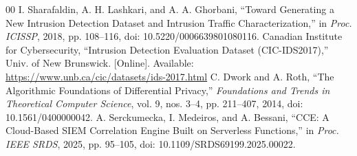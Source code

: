 \documentclass[conference,letterpaper]{IEEEtran}
\begin{document}
\begin{thebibliography}{00}
 I. Sharafaldin, A. H. Lashkari, and A. A. Ghorbani, ``Toward Generating a New Intrusion Detection Dataset and Intrusion Traffic Characterization,'' in \emph{Proc. ICISSP}, 2018, pp. 108--116, doi: 10.5220/0006639801080116.
 Canadian Institute for Cybersecurity, ``Intrusion Detection Evaluation Dataset (CIC-IDS2017),'' Univ. of New Brunswick. [Online]. Available: \url{https://www.unb.ca/cic/datasets/ids-2017.html}
 C. Dwork and A. Roth, ``The Algorithmic Foundations of Differential Privacy,'' \emph{Foundations and Trends in Theoretical Computer Science}, vol. 9, nos. 3--4, pp. 211--407, 2014, doi: 10.1561/0400000042.
 A. Serckumecka, I. Medeiros, and A. Bessani, ``CCE: A Cloud-Based SIEM Correlation Engine Built on Serverless Functions,'' in \emph{Proc. IEEE SRDS}, 2025, pp. 95--105, doi: 10.1109/SRDS69199.2025.00022.
\end{thebibliography}
\end{document}
